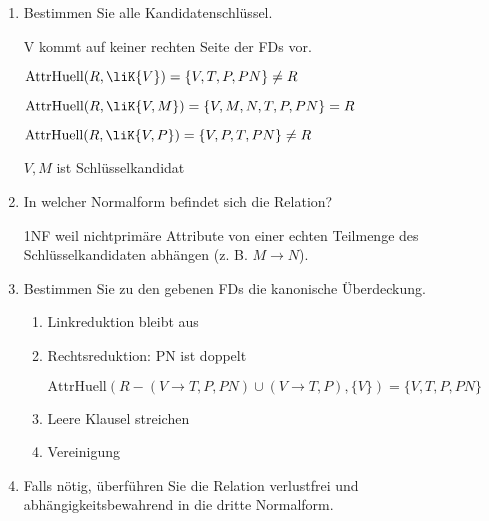 \documentclass{lehramt-informatik-aufgabe}
\begin{document}
\begin{enumerate}
\item Bestimmen Sie alle Kandidatenschlüssel.

\begin{liAntwort}
V kommt auf keiner rechten Seite der FDs vor.

$\text{AttrHuell}(R, \liK{V}) = \{V, T, P, PN\} \neq  R$

$\text{AttrHuell}(R, \liK{V, M}) = \{V, M, N, T, P, PN\} = R$

$\text{AttrHuell}(R, \liK{V, P}) = \{V, P, T, PN\} \neq R$

$V, M$ ist Schlüsselkandidat
\end{liAntwort}

\item In welcher Normalform befindet sich die Relation?

\begin{liAntwort}
1NF weil nichtprimäre Attribute von einer echten Teilmenge des
Schlüsselkandidaten abhängen (z. B. $M \rightarrow N$).
\end{liAntwort}

\item Bestimmen Sie zu den gebenen FDs die kanonische Überdeckung.

\begin{liAntwort}

\begin{enumerate}
\item Linkreduktion bleibt aus

\item Rechtsreduktion: PN ist doppelt

$\text{AttrHuell}(R - (V \rightarrow T, P, PN) \cup (V \rightarrow T, P), \{V\}) = \{V, T, P, PN\}$

\item Leere Klausel streichen

\item Vereinigung


\end{enumerate}

\end{liAntwort}

\item Falls nötig, überführen Sie die Relation verlustfrei und
abhängigkeitsbewahrend in die dritte Normalform.
\end{enumerate}
\end{document}
